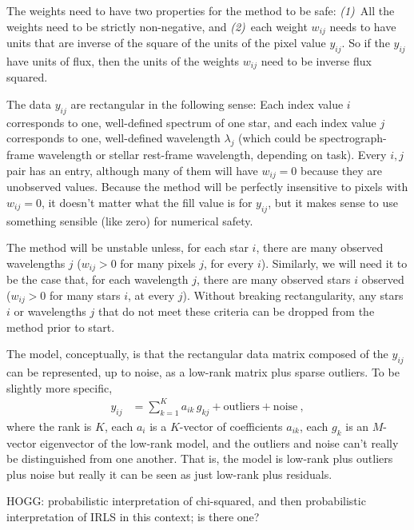 \documentclass{article}
\begin{document}
The weights need to have two properties for the method to be safe:
\textsl{(1)}~All the weights need to be strictly non-negative, and
\textsl{(2)}~each weight $w_{ij}$ needs to have units that are inverse of the square of the units of the pixel value $y_{ij}$.
So if the $y_{ij}$ have units of flux, then the units of the weights $w_{ij}$ need to be inverse flux squared.

The data $y_{ij}$ are rectangular in the following sense:
Each index value $i$ corresponds to one, well-defined spectrum of one star, and
each index value $j$ corresponds to one, well-defined wavelength $\lambda_j$ (which could be spectrograph-frame wavelength or stellar rest-frame wavelength, depending on task).
Every $i,j$ pair has an entry, although many of them will have $w_{ij}=0$ because they are unobserved values.
Because the method will be perfectly insensitive to pixels with $w_{ij}=0$, it doesn't matter what the fill value is for $y_{ij}$, but it makes sense to use something sensible (like zero) for numerical safety.

The method will be unstable unless, for each star $i$, there are many observed wavelengths $j$ ($w_{ij} > 0$ for many pixels $j$, for every $i$).
Similarly, we will need it to be the case that, for each wavelength $j$, there are many observed stars $i$ observed ($w_{ij} > 0$ for many stars $i$, at every $j$).
Without breaking rectangularity, any stars $i$ or wavelengths $j$ that do not meet these criteria can be dropped from the method prior to start.

The model, conceptually, is that the rectangular data matrix composed of the $y_{ij}$ can be represented, up to noise, as a low-rank matrix plus sparse outliers.
To be slightly more specific,
\begin{align}
    y_{ij} &= \sum_{k=1}^K a_{ik}\,g_{kj} + \text{outliers} + \text{noise} \label{eq:model}~,
\end{align}
where the rank is $K$,
each $a_i$ is a $K$-vector of coefficients $a_{ik}$,
each $g_k$ is an $M$-vector eigenvector of the low-rank model,
and the outliers and noise can't really be distinguished from one another.
That is, the model is low-rank plus outliers plus noise but really it can be seen as just low-rank plus residuals.

HOGG: probabilistic interpretation of chi-squared, and then probabilistic interpretation of IRLS in this context; is there one?
\end{document}
